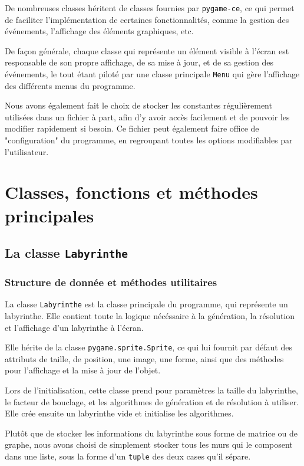 \documentclass[12pt]{scrreprt} %
\begin{document}
De nombreuses classes héritent de classes fournies par \texttt{pygame-ce}, ce qui permet de faciliter l'implémentation de certaines fonctionnalités, comme la gestion des événements, l'affichage des éléments graphiques, etc.

De façon générale, chaque classe qui représente un élément visible à l'écran est responsable de son propre affichage, de sa mise à jour, et de sa gestion des événements, le tout étant piloté par une classe principale \texttt{Menu} qui gère l'affichage des différents menus du programme.

Nous avons également fait le choix de stocker les constantes régulièrement utilisées dans un fichier à part, afin d'y avoir accès facilement et de pouvoir les modifier rapidement si besoin. Ce fichier peut également faire office de "configuration" du programme, en regroupant toutes les options modifiables par l'utilisateur.

\section{Classes, fonctions et méthodes principales}

\subsection{La classe \texttt{Labyrinthe}}

\subsubsection{Structure de donnée et méthodes utilitaires}

La classe \texttt{Labyrinthe} est la classe principale du programme, qui représente un labyrinthe. Elle contient toute la logique nécéssaire à la génération, la résolution et l'affichage d'un labyrinthe à l'écran.

Elle hérite de la classe \texttt{pygame.sprite.Sprite}, ce qui lui fournit par défaut des attributs de taille, de position, une image, une forme, ainsi que des méthodes pour l'affichage et la mise à jour de l'objet.

Lors de l'initialisation, cette classe prend pour paramètres la taille du labyrinthe, le facteur de bouclage, et les algorithmes de génération et de résolution à utiliser. Elle crée ensuite un labyrinthe vide et initialise les algorithmes.

Plutôt que de stocker les informations du labyrinthe sous forme de matrice ou de graphe, nous avons choisi de simplement stocker tous les murs qui le composent dans une liste, sous la forme d'un \texttt{tuple} des deux cases qu'il sépare.
\end{document}
